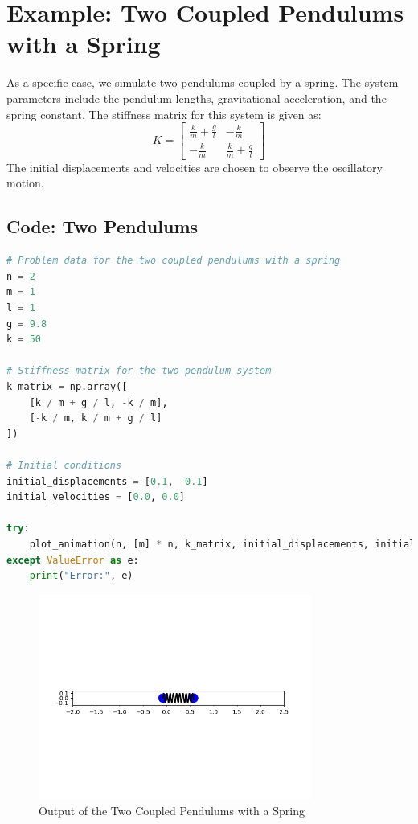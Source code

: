 \documentclass[a4paper,12pt]{article}
\begin{document}
\section*{Example: Two Coupled Pendulums with a Spring}
As a specific case, we simulate two pendulums coupled by a spring. The system parameters include the pendulum lengths, gravitational acceleration, and the spring constant. The stiffness matrix for this system is given as:
\[
K = \begin{bmatrix}
\frac{k}{m} + \frac{g}{l} & -\frac{k}{m} \\
-\frac{k}{m} & \frac{k}{m} + \frac{g}{l}
\end{bmatrix}
\]
The initial displacements and velocities are chosen to observe the oscillatory motion.

\subsection*{Code: Two Pendulums}
\begin{lstlisting}[language=Python, caption=Two coupled pendulums]
# Problem data for the two coupled pendulums with a spring
n = 2
m = 1
l = 1
g = 9.8
k = 50

# Stiffness matrix for the two-pendulum system
k_matrix = np.array([
    [k / m + g / l, -k / m],
    [-k / m, k / m + g / l]
])

# Initial conditions
initial_displacements = [0.1, -0.1]
initial_velocities = [0.0, 0.0]

try:
    plot_animation(n, [m] * n, k_matrix, initial_displacements, initial_velocities)
except ValueError as e:
    print("Error:", e)
\end{lstlisting}

\begin{figure}[h!]
    \centering
    \includegraphics[width=0.8\textwidth]{figures/Figure_2.png}
    \caption{Output of the Two Coupled Pendulums with a Spring}
\end{figure}
\end{document}
